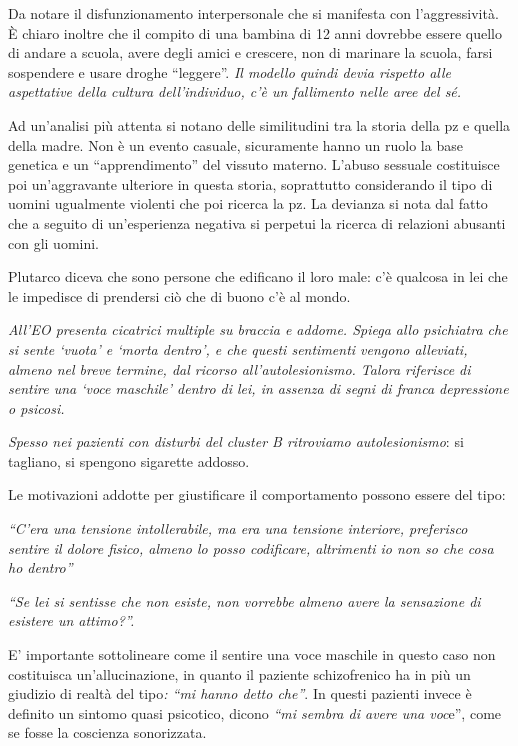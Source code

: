 Da notare il disfunzionamento interpersonale che si manifesta con
l'aggressività. È chiaro inoltre che il compito di una bambina di 12
anni dovrebbe essere quello di andare a scuola, avere degli amici e
crescere, non di marinare la scuola, farsi sospendere e usare droghe
``leggere''. \emph{Il modello quindi devia rispetto alle aspettative
della cultura dell'individuo, c'è un fallimento nelle aree del sé.}

Ad un'analisi più attenta si notano delle similitudini tra la storia
della pz e quella della madre. Non è un evento casuale, sicuramente
hanno un ruolo la base genetica e un ``apprendimento'' del vissuto
materno. L'abuso sessuale costituisce poi un'aggravante ulteriore in
questa storia, soprattutto considerando il tipo di uomini ugualmente
violenti che poi ricerca la pz. La devianza si nota dal fatto che a
seguito di un'esperienza negativa si perpetui la ricerca di relazioni
abusanti con gli uomini.

Plutarco diceva che sono persone che edificano il loro male: c'è
qualcosa in lei che le impedisce di prendersi ciò che di buono c'è al
mondo.

\emph{All'EO presenta cicatrici multiple su braccia e addome. Spiega
allo psichiatra che si sente `vuota' e `morta dentro', e che questi
sentimenti vengono alleviati, almeno nel breve termine, dal ricorso
all'autolesionismo. Talora riferisce di sentire una `voce maschile'
dentro di lei, in assenza di segni di franca depressione o psicosi. }

\emph{Spesso nei pazienti con disturbi del cluster B ritroviamo
autolesionismo}: si tagliano, si spengono sigarette addosso.

Le motivazioni addotte per giustificare il comportamento possono essere
del tipo:

\emph{``C'era una tensione intollerabile, ma era una tensione interiore,
preferisco sentire il dolore fisico, almeno lo posso codificare,
altrimenti io non so che cosa ho dentro''}

\emph{``Se lei si sentisse che non esiste, non vorrebbe almeno avere la
sensazione di esistere un attimo?''.}

E' importante sottolineare come il sentire una voce maschile in questo
caso non costituisca un'allucinazione, in quanto il paziente
schizofrenico ha in più un giudizio di realtà del tipo\emph{: ``mi hanno
detto che''}. In questi pazienti invece è definito un sintomo quasi
psicotico, dicono \emph{``mi sembra di avere una voc}e'', come se fosse
la coscienza sonorizzata.

